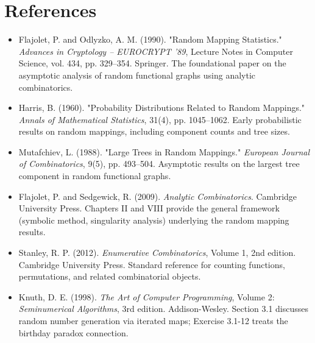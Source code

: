 \section{References}

\begin{itemize}
\item Flajolet, P. and Odlyzko, A. M. (1990). "Random Mapping Statistics." \textit{Advances in Cryptology -- EUROCRYPT '89}, Lecture Notes in Computer Science, vol. 434, pp. 329--354. Springer. The foundational paper on the asymptotic analysis of random functional graphs using analytic combinatorics.
\end{itemize}

\begin{itemize}
\item Harris, B. (1960). "Probability Distributions Related to Random Mappings." \textit{Annals of Mathematical Statistics}, 31(4), pp. 1045--1062. Early probabilistic results on random mappings, including component counts and tree sizes.
\end{itemize}

\begin{itemize}
\item Mutafchiev, L. (1988). "Large Trees in Random Mappings." \textit{European Journal of Combinatorics}, 9(5), pp. 493--504. Asymptotic results on the largest tree component in random functional graphs.
\end{itemize}

\begin{itemize}
\item Flajolet, P. and Sedgewick, R. (2009). \textit{Analytic Combinatorics}. Cambridge University Press. Chapters II and VIII provide the general framework (symbolic method, singularity analysis) underlying the random mapping results.
\end{itemize}

\begin{itemize}
\item Stanley, R. P. (2012). \textit{Enumerative Combinatorics}, Volume 1, 2nd edition. Cambridge University Press. Standard reference for counting functions, permutations, and related combinatorial objects.
\end{itemize}

\begin{itemize}
\item Knuth, D. E. (1998). \textit{The Art of Computer Programming}, Volume 2: \textit{Seminumerical Algorithms}, 3rd edition. Addison-Wesley. Section 3.1 discusses random number generation via iterated maps; Exercise 3.1-12 treats the birthday paradox connection.
\end{itemize}


